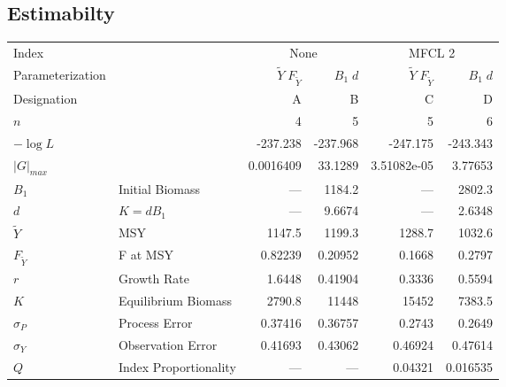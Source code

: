\documentclass[letterpaper,KOMA,landscape,titlepage]{powersem}
\newcommand\MSY{\widetilde{Y}}
\newcommand\Fmsy{F_{\MSY}}
\newcommand\MSYFmsy{\MSY\;\Fmsy}
\newcommand\Bd{B_1\; d}
\begin{document}
\begin{slide}\section{Estimabilty}
{\scriptsize
\label{tag:ests4}
\begin{center}
\begin{tabular}{|ll|rr|rr|}
\hline
Index && \multicolumn{2}{c|}{None}&\multicolumn{2}{c|}{MFCL 2}\\
\cline{3-4}\cline{5-6}
Parameterization&&$\MSYFmsy$&$\Bd$&$\MSYFmsy$&$\Bd$\\
Designation&& A & B& C& D\\
\hline
\hline
$n$ & &4 & 5 & 5 & 6\\
$-\log L$& & -237.238 & -237.968 & -247.175 & -243.343\\
$|G|_{max}$& & 0.0016409 & 33.1289 & 3.51082e-05 & 3.77653\\
\hline
$B_1$& Initial Biomass & --- & 1184.2 & --- & 2802.3\\
$d$ &$K=dB_1$ & --- & 9.6674 & --- & 2.6348\\
$\MSY$& MSY & 1147.5 & 1199.3 & 1288.7 & 1032.6\\
$\Fmsy$& F at MSY & 0.82239 & 0.20952 & 0.1668 & 0.2797\\
$r$& Growth Rate & 1.6448 & 0.41904 & 0.3336 & 0.5594\\
$K$& Equilibrium Biomass & 2790.8 & 11448 & 15452 & 7383.5\\
$\sigma_P$& Process Error & 0.37416 & 0.36757 & 0.2743 & 0.2649\\
$\sigma_Y$& Observation Error & 0.41693 & 0.43062 & 0.46924 & 0.47614\\
$Q$& Index Proportionality  & --- & --- & 0.04321 & 0.016535\\
\hline
\end{tabular}
\end{center}
}
\end{slide}
\end{document}
